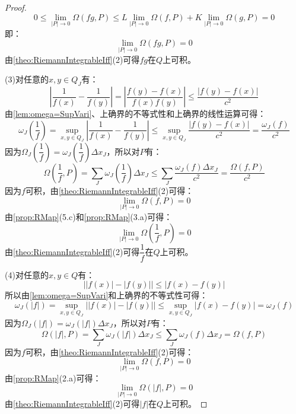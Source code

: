 \begin{proof}
	\begin{equation*}
		0\leqslant\lim_{|P|\to0}\Omega(fg,P)\leqslant L\lim_{|P|\to0}\Omega(f,P)+K\lim_{|P|\to0}\Omega(g,P)=0
	\end{equation*}
	即：
	\begin{equation*}
		\lim_{|P|\to0}\Omega(fg,P)=0
	\end{equation*}
	由\cref{theo:RiemannIntegrableIff}(2)可得$fg$在$Q$上可积。\par
	(3)对任意的$x,y\in Q_J$有：
	\begin{equation*}
		\left|\frac{1}{f(x)}-\frac{1}{f(y)}\right|=\left|\frac{f(y)-f(x)}{f(x)f(y)}\right|\leqslant\frac{|f(y)-f(x)|}{c^2}
	\end{equation*}
	由\cref{lem:omega=SupVari}、上确界的不等式性和上确界的线性运算可得：
	\begin{equation*}
		\omega_J\left(\frac{1}{f}\right)=\sup_{x,y\in Q_J}\left|\frac{1}{f(x)}-\frac{1}{f(y)}\right|\leqslant\sup_{x,y\in Q_J}\frac{|f(y)-f(x)|}{c^2}=\frac{\omega_J(f)}{c^2}
	\end{equation*}
	因为$\Omega_J\left(\dfrac{1}{f}\right)=\omega_J\left(\dfrac{1}{f}\right)\Delta x_J$，所以对$P$有：
	\begin{equation*}
		\Omega\left(\dfrac{1}{f},P\right)=\sum_{J}\omega_J\left(\dfrac{1}{f}\right)\Delta x_J\leqslant\sum_{J}\frac{\omega_J(f)\Delta x_J}{c^2}=\frac{\Omega(f,P)}{c^2}
	\end{equation*}
	因为$f$可积，由\cref{theo:RiemannIntegrableIff}(2)可得：
	\begin{equation*}
		\lim_{|P|\to0}\Omega(f,P)=0
	\end{equation*}
	由\cref{prop:RMap}(5.c)和\cref{prop:RMap}(3.a)可得：
	\begin{equation*}
		\lim_{|P|\to0}\Omega\left(\frac{1}{f},P\right)=0
	\end{equation*}
	由\cref{theo:RiemannIntegrableIff}(2)可得$\dfrac{1}{f}$在$Q$上可积。\par
	(4)对任意的$x,y\in Q$有：
	\begin{equation*}
		\Big||f(x)|-|f(y)|\Big|\leqslant|f(x)-f(y)|
	\end{equation*}
	所以由\cref{lem:omega=SupVari}和上确界的不等式性可得：
	\begin{equation*}
		\omega_J(|f|)=\sup_{x,y\in Q_J}\Big||f(x)|-|f(y)|\Big|\leqslant\sup_{x,y\in Q_J}|f(x)-f(y)|=\omega_J(f)
	\end{equation*}
	因为$\Omega_J(|f|)=\omega_J(|f|)\Delta x_J$，所以对$P$有：
	\begin{equation*}
		\Omega(|f|,P)=\sum_{J}\omega_J(|f|)\Delta x_J\leqslant\sum_{J}\omega_J(f)\Delta x_J=\Omega(f,P)
	\end{equation*}
	因为$f$可积，由\cref{theo:RiemannIntegrableIff}(2)可得：
	\begin{equation*}
		\lim_{|P|\to0}\Omega(f,P)=0
	\end{equation*}
	由\cref{prop:RMap}(2.a)可得：
	\begin{equation*}
		\lim_{|P|\to0}\Omega\left(|f|,P\right)=0
	\end{equation*}
	由\cref{theo:RiemannIntegrableIff}(2)可得$|f|$在$Q$上可积。
\end{proof}
